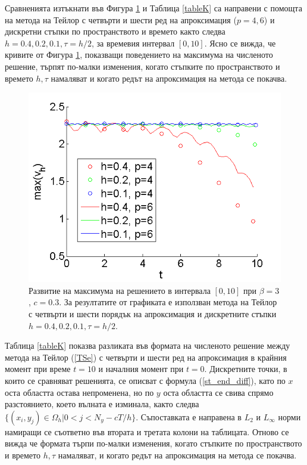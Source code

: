 \documentclass[a4paper]{article}
\newcommand{\rf}[1]{(\ref{#1})}
\theoremstyle{remark}
\begin{document}
\begin{large}
Сравненията изтъкнати във Фигура \ref{MultiMaximum} и Таблица \ref{tableK} са направени с помощта на метода на Тейлор с четвърти и шести ред на апроксимация ($p=4,6$) и дискретни стъпки по пространството и времето както следва $h=0.4, 0.2, 0.1, \tau = h/2$, за времевия интервал $[0, 10]$. Ясно се вижда, че кривите от Фигура \ref{MultiMaximum}, показващи поведението на максимума на численото решение, търпят по-малки изменения, когато стъпките по пространството и времето $h, \tau$ намаляват и когато редът на апроксимация на метода се покачва.

\begin{figure}
	\centering
	\includegraphics[width=0.98\linewidth]{Maximum_TaylorZeroBnd_50x50_bt3_c030.png}
\caption{Развитие на максимума на решението в интервала $[0, 10]$ при $\beta = 3$, $c=0.3$. За резултатите от графиката е използван метода на Тейлор с четвърти и шести порядък на апроксимация и дискретните стъпки $h=0.4, 0.2, 0.1, \tau = h/2$.}
\label{MultiMaximum}
\end{figure}
\FloatBarrier

Таблица \ref{tableK} показва разликата във формата на численото решение между метода на Тейлор \rf{TSe} с четвърти и шести ред на апроксимация в крайния момент при време $t=10$ и началния момент при $t=0$. Дискретните точки, в които се сравняват решенията, се описват с формула \rf{st_end_diff}, като по $x$ оста областта остава непроменена, но по $y$ оста областта се свива спрямо разстоянието, което вълната е изминала, както следва $\{(x_i, y_j) \in \Omega_h |0 < j < N_y - cT/h\}$. Съпоставката е направена в $L_2$ и $L_\infty$ норми намиращи се съответно във втората и третата колони на таблицата. Отново се вижда че формата търпи по-малки изменения, когато стъпките по пространството и времето $h, \tau$ намаляват, и когато редът на апроксимация на метода се покачва.


\end{large}
\end{document}
